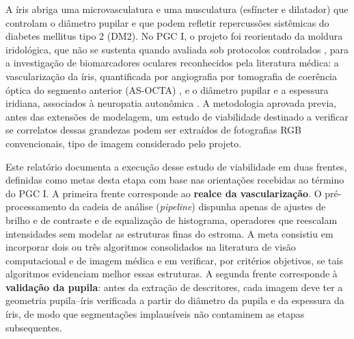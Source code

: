 \documentclass[12pt, oneside, a4paper, chapter=TITLE, section=TITLE,
               english, brazil]{abntex2}
\begin{document}
A íris abriga uma microvasculatura e uma musculatura (esfíncter e dilatador)
que controlam o diâmetro pupilar e que podem refletir repercussões sistêmicas
do diabetes mellitus tipo 2 (DM2). No PGC I, o projeto foi reorientado da
moldura iridológica, que não se sustenta quando avaliada sob protocolos
controlados \citep*{Ernst2000,Simon1979}, para a investigação de biomarcadores
oculares reconhecidos pela literatura médica: a vascularização da íris,
quantificada por angiografia por tomografia de coerência óptica do segmento
anterior (AS-OCTA) \citep*{Roberts2017,Zett2018,Zhou2025}, e o diâmetro
pupilar e a espessura iridiana, associados à neuropatia autonômica
\citep*{Cui2024,Thakar2025}. A metodologia aprovada previa, antes das extensões
de modelagem, um estudo de viabilidade destinado a verificar se correlatos
dessas grandezas podem ser extraídos de fotografias RGB convencionais, tipo de
imagem considerado pelo projeto.

Este relatório documenta a execução desse estudo de viabilidade em duas
frentes, definidas como metas desta etapa com base nas orientações recebidas
ao término do PGC I. A primeira frente corresponde ao \textbf{realce da
vascularização}. O pré-processamento da cadeia de análise (\emph{pipeline})
dispunha apenas de ajustes de brilho e de contraste e de equalização de
histograma, operadores que reescalam intensidades sem modelar as estruturas
finas do estroma. A meta consistiu em incorporar dois ou três algoritmos
consolidados na literatura de visão computacional e de imagem médica e em
verificar, por critérios objetivos, se tais algoritmos evidenciam melhor essas
estruturas. A segunda frente corresponde à \textbf{validação da pupila}: antes
da extração de descritores, cada imagem deve ter a geometria pupila--íris
verificada a partir do diâmetro da pupila e da espessura da íris, de modo que
segmentações implausíveis não contaminem as etapas subsequentes.
\end{document}
